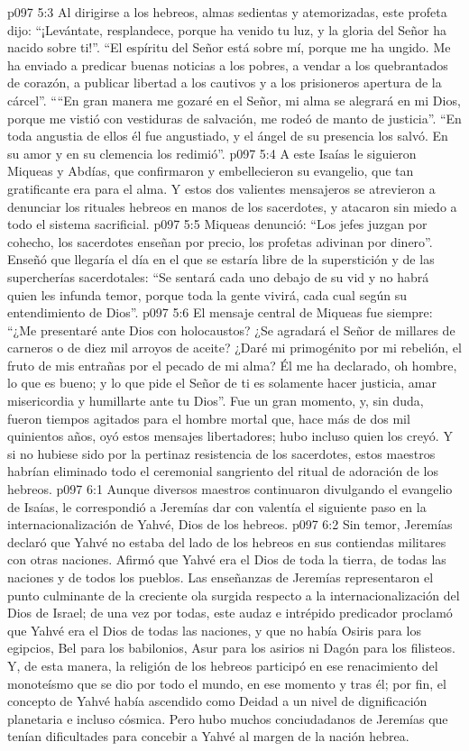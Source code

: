 \vs p097 5:3 Al dirigirse a los hebreos, almas sedientas y atemorizadas, este profeta dijo: “¡Levántate, resplandece, porque ha venido tu luz, y la gloria del Señor ha nacido sobre ti!”. “El espíritu del Señor está sobre mí, porque me ha ungido. Me ha enviado a predicar buenas noticias a los pobres, a vendar a los quebrantados de corazón, a publicar libertad a los cautivos y a los prisioneros apertura de la cárcel”. ““En gran manera me gozaré en el Señor, mi alma se alegrará en mi Dios, porque me vistió con vestiduras de salvación, me rodeó de manto de justicia”. “En toda angustia de ellos él fue angustiado, y el ángel de su presencia los salvó. En su amor y en su clemencia los redimió”.
\vs p097 5:4 \pc A este Isaías le siguieron Miqueas y Abdías, que confirmaron y embellecieron su evangelio, que tan gratificante era para el alma. Y estos dos valientes mensajeros se atrevieron a denunciar los rituales hebreos en manos de los sacerdotes, y atacaron sin miedo a todo el sistema sacrificial.
\vs p097 5:5 Miqueas denunció: “Los jefes juzgan por cohecho, los sacerdotes enseñan por precio, los profetas adivinan por dinero”. Enseñó que llegaría el día en el que se estaría libre de la superstición y de las supercherías sacerdotales: “Se sentará cada uno debajo de su vid y no habrá quien les infunda temor, porque toda la gente vivirá, cada cual según su entendimiento de Dios”.
\vs p097 5:6 El mensaje central de Miqueas fue siempre: “¿Me presentaré ante Dios con holocaustos? ¿Se agradará el Señor de millares de carneros o de diez mil arroyos de aceite? ¿Daré mi primogénito por mi rebelión, el fruto de mis entrañas por el pecado de mi alma? Él me ha declarado, oh hombre, lo que es bueno; y lo que pide el Señor de ti es solamente hacer justicia, amar misericordia y humillarte ante tu Dios”. Fue un gran momento, y, sin duda, fueron tiempos agitados para el hombre mortal que, hace más de dos mil quinientos años, oyó estos mensajes libertadores; hubo incluso quien los creyó. Y si no hubiese sido por la pertinaz resistencia de los sacerdotes, estos maestros habrían eliminado todo el ceremonial sangriento del ritual de adoración de los hebreos.
\vs p097 6:1 Aunque diversos maestros continuaron divulgando el evangelio de Isaías, le correspondió a Jeremías dar con valentía el siguiente paso en la internacionalización de Yahvé, Dios de los hebreos.
\vs p097 6:2 Sin temor, Jeremías declaró que Yahvé no estaba del lado de los hebreos en sus contiendas militares con otras naciones. Afirmó que Yahvé era el Dios de toda la tierra, de todas las naciones y de todos los pueblos. Las enseñanzas de Jeremías representaron el punto culminante de la creciente ola surgida respecto a la internacionalización del Dios de Israel; de una vez por todas, este audaz e intrépido predicador proclamó que Yahvé era el Dios de todas las naciones, y que no había Osiris para los egipcios, Bel para los babilonios, Asur para los asirios ni Dagón para los filisteos. Y, de esta manera, la religión de los hebreos participó en ese renacimiento del monoteísmo que se dio por todo el mundo, en ese momento y tras él; por fin, el concepto de Yahvé había ascendido como Deidad a un nivel de dignificación planetaria e incluso cósmica. Pero hubo muchos conciudadanos de Jeremías que tenían dificultades para concebir a Yahvé al margen de la nación hebrea.
